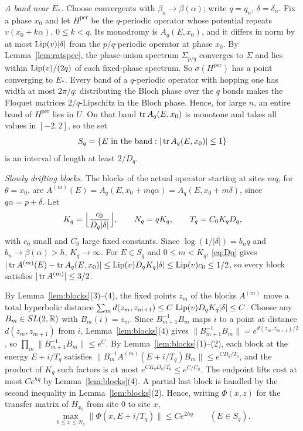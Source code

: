 \emph{A band near $E_*$.} Choose convergents with $\beta_n\to\beta(\alpha)$; write $q=q_n$, $\delta=\delta_n$. Fix a phase $x_0$ and let $H^{\mathrm{per}}$ be the $q$-periodic operator whose potential repeats $v(x_0+k\alpha)$, $0\le k<q$. Its monodromy is $A_q(E,x_0)$, and it differs in norm by at most $\operatorname{Lip}(v)|\delta|$ from the $p/q$-periodic operator at phase $x_0$. By Lemma~\ref{lem:ratspec}, the phase-union spectrum $\Sigma_{p/q}$ converges to $\Sigma$ and lies within $\operatorname{Lip}(v)/(2q)$ of each fixed-phase spectrum. So $\sigma(H^{\mathrm{per}})$ has a point converging to $E_*$. Every band of a $q$-periodic operator with hopping one has width at most $2\pi/q$: distributing the Bloch phase over the $q$ bonds makes the Floquet matrices $2/q$-Lipschitz in the Bloch phase. Hence, for large $n$, an entire band of $H^{\mathrm{per}}$ lies in $U$. On that band $\operatorname{tr} A_q(E,x_0)$ is monotone and takes all values in $[-2,2]$, so the set
\[
S_q=\{E\text{ in the band}:|\operatorname{tr} A_q(E,x_0)|\le1\}
\]
is an interval of length at least $2/D_q$.

\emph{Slowly drifting blocks.} The blocks of the actual operator starting at sites $mq$, for $\theta=x_0$, are $A^{(m)}(E)=A_q(E,x_0+mq\alpha)=A_q(E,x_0+m\delta)$, since $q\alpha=p+\delta$. Let
\[
K_q=\Bigl\lfloor\frac{c_0}{D_q|\delta|}\Bigr\rfloor,\qquad N_q=qK_q,\qquad T_q=C_0K_qD_q,
\]
with $c_0$ small and $C_0$ large fixed constants. Since $\log(1/|\delta|)=b_nq$ and $b_n\to\beta(\alpha)>h$, $K_q\to\infty$. For $E\in S_q$ and $0\le m<K_q$, \eqref{eq:Dq} gives $|\operatorname{tr} A^{(m)}(E)-\operatorname{tr} A_q(E,x_0)|\le\operatorname{Lip}(v)D_qK_q|\delta|\le\operatorname{Lip}(v)c_0\le1/2$, so every block satisfies $|\operatorname{tr} A^{(m)}|\le3/2$.

By Lemma~\ref{lem:blocks}(3)--(4), the fixed points $z_m$ of the blocks $A^{(m)}$ move a total hyperbolic distance $\sum_md(z_m,z_{m+1})\le C\,\operatorname{Lip}(v)D_qK_q|\delta|\le C$. Choose any $B_m\in SL(2,\mathbb R)$ with $B_m(i)=z_m$. Since $B_{m+1}^{-1}B_m$ maps $i$ to a point at distance $d(z_m,z_{m+1})$ from $i$, Lemma~\ref{lem:blocks}(4) gives $\|B_{m+1}^{-1}B_m\|=e^{d(z_m,z_{m+1})/2}$, so $\prod_m\|B_{m+1}^{-1}B_m\|\le e^{C}$. By Lemma~\ref{lem:blocks}(1)--(2), each block at the energy $E+i/T_q$ satisfies $\|B_m^{-1}A^{(m)}(E+i/T_q)B_m\|\le e^{CD_q/T_q}$, and the product of $K_q$ such factors is at most $e^{CK_qD_q/T_q}\le e^{C/C_0}$. The endpoint lifts cost at most $Ce^{hq}$ by Lemma~\ref{lem:blocks}(4). A partial last block is handled by the second inequality in Lemma~\ref{lem:blocks}(2). Hence, writing $\Phi(x,z)$ for the transfer matrix of $H_{x_0}$ from site $0$ to site $x$,
\begin{equation}\label{eq:L7}
\max_{0\le x\le N_q}\|\Phi(x,E+i/T_q)\|\le Ce^{2hq}\qquad(E\in S_q).
\end{equation}

